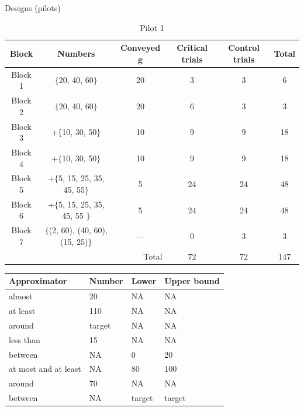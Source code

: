 \documentclass[xcolor=table, hyperref={pdfpagelabels=false}]{beamer}
\begin{document}
\begin{frame}{Designs (pilots)}
\setlength\tabcolsep{1pt}  %
\tiny  %
\begin{table}[H]
	\centering
	\begin{tabular}{c|c|c|c|c|c}
		Block & Numbers & Conveyed g & Critical trials & Control trials & Total\\ \hline
		Block 1 & $\lbrace$20, 40, 60$\rbrace$ & 20 & 3 & 3 & 6\\
		Block 2 & $\lbrace$20, 40, 60$\rbrace$ & 20 & 6 & 3 & 3\\
		Block 3 & +$\lbrace$10, 30, 50$\rbrace$ & 10 & 9 & 9 & 18 \\
		Block 4	& +$\lbrace$10, 30, 50$\rbrace$ & 10 & 9 & 9 & 18\\
		Block 5	& +$\lbrace$5, 15, 25, 35, 45, 55$\rbrace$ & 5 & 24 & 24 & 48 \\
		Block 6 & +$\lbrace$5, 15, 25, 35, 45, 55 $\rbrace$ & 5 & 24 & 24 & 48\\
		Block 7 & $\lbrace$(2, 60), (40, 60), (15, 25)$\rbrace$& ---	& 0	& 3 & 3\\ \hline
		\multicolumn{3}{r|}{Total} & 72 & 72& 147
	\end{tabular}
	\caption{Pilot 1}
\end{table}
\begin{minipage}{.47\textwidth}
	\begin{table}[H]
	\centering
	\begin{tabular}{l|lll}
		Approximator                        & Number & Lower & Upper bound  \\ \hline
		almost                              & 20     & NA          & NA           \\
		at least                            & 110    & NA          & NA           \\
		\rowcolor[rgb]{0.8,0.8,0.8} around  & target & NA          & NA           \\
		less than                           & 15     & NA          & NA           \\
		between                             & NA     & 0           & 20           \\
		at most and at least                & NA     & 80          & 100          \\
		around                              & 70     & NA          & NA           \\
		\rowcolor[rgb]{0.8,0.8,0.8} between & NA     & target      & target      
	\end{tabular}

\end{table}
\end{minipage}
\end{frame}
\end{document}
